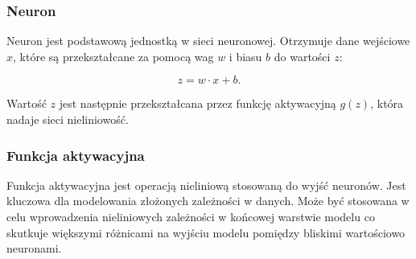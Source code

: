 \begin{table}[ht]
	\centering
	\caption{Rodzaje warstw w sieciach neuronowych}
	\label{tab:layer_types}
	\begin{center}
	\end{center}
\end{table}

\subsubsection{Neuron}

Neuron jest podstawową jednostką w sieci neuronowej. Otrzymuje dane wejściowe \(x\), które są przekształcane za pomocą wag \(w\) i biasu \(b\) do wartości \(z\):

\[
	z = w \cdot x + b.
\]

Wartość \(z\) jest następnie przekształcana przez funkcję aktywacyjną \(g(z)\), która nadaje sieci nieliniowość.

\subsubsection{Funkcja aktywacyjna}

Funkcja aktywacyjna jest operacją nieliniową stosowaną do wyjść neuronów. Jest kluczowa dla modelowania złożonych zależności w danych.
Może być stosowana w celu wprowadzenia nieliniowych zależności w końcowej warstwie modelu co skutkuje większymi różnicami na wyjściu modelu pomiędzy bliskimi wartościowo neuronami.

